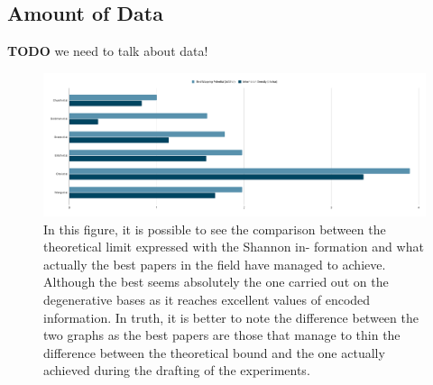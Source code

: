 \documentclass[10pt,twocolumn,twoside]{gsajnl}
\begin{document}
\subsection{Amount of Data}
\textbf{TODO} we need to talk about data!

\begin{figure}[h!]
    \centering
    \includegraphics[width = \textwidth]{Figures/shennon chart .png}
    \caption{In this figure, it is possible to see the comparison between the theoretical limit expressed with the Shannon in-
formation and what actually the best papers in the field have managed to achieve. Although the best seems absolutely
the one carried out on the degenerative bases as it reaches excellent values of encoded information. In truth, it is better
to note the difference between the two graphs as the best papers are those that manage to thin the difference between
the theoretical bound and the one actually achieved during the drafting of the experiments.}
    \label{fig:my_label3}
\end{figure}
\end{document}
